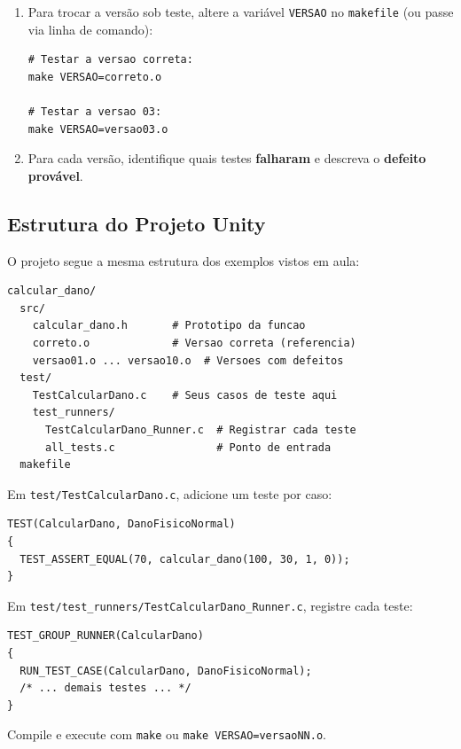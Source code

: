 \documentclass[12pt,a4paper]{article}
\begin{document}
\begin{enumerate}
\begin{enumerate}[label=\alph*)]
    \url{https://github.com/iacanaweber/Unity}

    O projeto está na pasta \texttt{examples/calcular\_dano/}.

    A estrutura já está pronta --- basta adicionar seus testes no arquivo \texttt{test/TestCalcularDano.c}.
    \item Para trocar a versão sob teste, altere a variável \texttt{VERSAO} no \texttt{makefile} (ou passe via linha de comando):
    \begin{lstlisting}[style=code]
# Testar a versao correta:
make VERSAO=correto.o

# Testar a versao 03:
make VERSAO=versao03.o
    \end{lstlisting}
    \item Para cada versão, identifique quais testes \textbf{falharam} e descreva o \textbf{defeito provável}.
  \end{enumerate}
\end{enumerate}

\subsection{Estrutura do Projeto Unity}

O projeto segue a mesma estrutura dos exemplos vistos em aula:

\begin{lstlisting}[style=code,basicstyle=\ttfamily\footnotesize]
calcular_dano/
  src/
    calcular_dano.h       # Prototipo da funcao
    correto.o             # Versao correta (referencia)
    versao01.o ... versao10.o  # Versoes com defeitos
  test/
    TestCalcularDano.c    # Seus casos de teste aqui
    test_runners/
      TestCalcularDano_Runner.c  # Registrar cada teste
      all_tests.c                # Ponto de entrada
  makefile
\end{lstlisting}

\begin{tcolorbox}[colback=blue!5, colframe=blue!40, title=\textbf{Como adicionar testes}, fonttitle=\small]
\small
Em \texttt{test/TestCalcularDano.c}, adicione um teste por caso:
\begin{lstlisting}[style=code]
TEST(CalcularDano, DanoFisicoNormal)
{
  TEST_ASSERT_EQUAL(70, calcular_dano(100, 30, 1, 0));
}
\end{lstlisting}
Em \texttt{test/test\_runners/TestCalcularDano\_Runner.c}, registre cada teste:
\begin{lstlisting}[style=code]
TEST_GROUP_RUNNER(CalcularDano)
{
  RUN_TEST_CASE(CalcularDano, DanoFisicoNormal);
  /* ... demais testes ... */
}
\end{lstlisting}
Compile e execute com \texttt{make} ou \texttt{make VERSAO=versaoNN.o}.
\end{tcolorbox}
\end{document}
